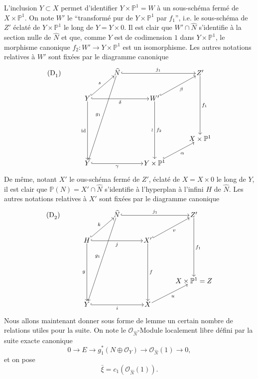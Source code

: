 \documentclass[11pt]{article}
\begin{document}
L'inclusion $Y\subset X$ permet d'identifier $Y\times\mathbb P^1=W$ à un sous-schéma fermé de $X\times\mathbb P^1$. On note $W'$ le ``transformé pur de $Y\times\mathbb P^1$ par $f_1$'', i.e. le sous-schéma de $Z'$ éclaté de $Y\times\mathbb P^1$ le long de $Y=Y\times0$. Il est clair que $W'\cap\widehat N$ s'identifie à la section nulle de $\widehat N$ et que, comme $Y$ est de codimension $1$ dans $Y\times\mathbb P^1$, le morphisme canonique $f_2:W'\to Y\times\mathbb P^1$ est un isomorphisme. Les autres notations relatives à $W'$ sont fixées par le diagramme canonique
\[
\begin{tikzcd}[column sep=3.2em,row sep=2.4em,cells={nodes={inner sep=1pt}}]
\text{(D}_1\text{)}\arrow[from=1-3,to=5-2,"g_1"']
& & \widehat N \arrow[rr,hook,"j_1"] & & Z' \arrow[ddd,"f_1"] \\
& Y \arrow[ur,hook,"s"] \arrow[rr,hook,"\delta"'] \arrow[ddd,"\mathrm{id}"'] & &
W' \arrow[ur,hook,"\beta"'] \arrow[ddd,"\wr"',"f_2"] & \\
& & & & \\
& & & & X\times\mathbb P^1 \\
& Y \arrow[rr,hook,"\gamma"'] & & Y\times\mathbb P^1 \arrow[ur,hook,"\alpha"'] &
\end{tikzcd}
\]
De même, notant $X'$ le ous-schéma fermé de $Z'$, éclaté de $X=X\times0$ le long de $Y$, il est
clair que $\mathbb P(N)=X'\cap\widehat N$ s'identifie à l'hyperplan à l'infini $H$ de $\widehat N$. Les autres notations relatives à $X'$ sont fixées par le diagramme canonique
\[
\begin{tikzcd}[column sep=3.2em,row sep=2.4em,cells={nodes={inner sep=1pt}}]
\text{(D}_2\text{)}\arrow[from=1-3,to=5-2,"g_1"']
& & \widehat N \arrow[rr,hook,"j_1"] & & Z' \arrow[ddd,"f_1"] \\
& H \arrow[ur,hook,"k"] \arrow[rr,hook,"j"'] \arrow[ddd,"g"'] & &
X' \arrow[ur,hook,"v"'] \arrow[ddd,"f"] & \\
& & & & \\
& & & & X\times\mathbb P^1=Z \\
& Y \arrow[rr,hook,"i"'] & & X \arrow[ur,"u"'] &
\end{tikzcd}
\]
Nous allons maintenant donner sous forme de lemme un certain nombre de relations utiles pour la suite. On note le $\mathcal O_{\widehat N}$-Module localement libre défini par la suite exacte canonique
\[
0\to E\to g_1^*(N\oplus\mathcal O_Y)\to\mathcal O_{\widehat N}(1)\to0,
\tag{9.3.0}
\]
et on pose
\[
\bar\xi=c_1(\mathcal O_{\widehat N}(1)).
\tag{9.3.1}
\]
\end{document}
